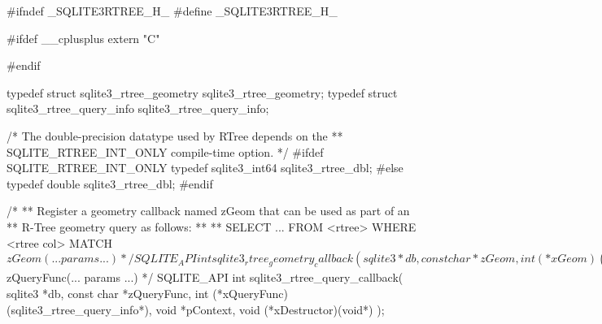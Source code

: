 \begin{Codex}[label=sqlite3.h,numbers=left]
#ifndef _SQLITE3RTREE_H_
#define _SQLITE3RTREE_H_


#ifdef __cplusplus
extern "C" {
#endif

typedef struct sqlite3_rtree_geometry sqlite3_rtree_geometry;
typedef struct sqlite3_rtree_query_info sqlite3_rtree_query_info;

/* The double-precision datatype used by RTree depends on the
** SQLITE_RTREE_INT_ONLY compile-time option.
*/
#ifdef SQLITE_RTREE_INT_ONLY
  typedef sqlite3_int64 sqlite3_rtree_dbl;
#else
  typedef double sqlite3_rtree_dbl;
#endif

/*
** Register a geometry callback named zGeom that can be used as part of an
** R-Tree geometry query as follows:
**
**   SELECT ... FROM <rtree> WHERE <rtree col> MATCH $zGeom(... params ...)
*/
SQLITE_API int sqlite3_rtree_geometry_callback(
  sqlite3 *db,
  const char *zGeom,
  int (*xGeom)(sqlite3_rtree_geometry*, int, sqlite3_rtree_dbl*,int*),
  void *pContext
);


/*
** A pointer to a structure of the following type is passed as the first
** argument to callbacks registered using rtree_geometry_callback().
*/
struct sqlite3_rtree_geometry {
  void *pContext;                 /* Copy of pContext passed to s_r_g_c() */
  int nParam;                     /* Size of array aParam[] */
  sqlite3_rtree_dbl *aParam;      /* Parameters passed to SQL geom function */
  void *pUser;                    /* Callback implementation user data */
  void (*xDelUser)(void *);       /* Called by SQLite to clean up pUser */
};

/*
** Register a 2nd-generation geometry callback named zScore that can be 
** used as part of an R-Tree geometry query as follows:
**
**   SELECT ... FROM <rtree> WHERE <rtree col> MATCH $zQueryFunc(... params ...)
*/
SQLITE_API int sqlite3_rtree_query_callback(
  sqlite3 *db,
  const char *zQueryFunc,
  int (*xQueryFunc)(sqlite3_rtree_query_info*),
  void *pContext,
  void (*xDestructor)(void*)
);


}
\end{Codex}
